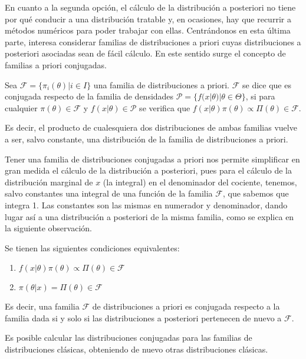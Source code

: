 \documentclass{article}
\begin{document}
En cuanto a la segunda opción, el cálculo de la distribución a posteriori no tiene por qué conducir a una distribución tratable y, en ocasiones, hay que recurrir a métodos numéricos para poder trabajar con ellas. Centrándonos en esta última parte, interesa considerar familias de distribuciones a priori cuyas distribuciones a posteriori asociadas sean de fácil cálculo. En este sentido surge el concepto de familias a priori conjugadas.

\begin{definition}
	Sea $\mathcal{F} = \{\pi_i(\theta)|i\in I\}$ una familia de distribuciones a priori. $\mathcal{F}$ se dice que es conjugada respecto de la familia de densidades $\mathcal{P} = \{f(x|\theta)|\theta\in\Theta\}$, si para cualquier $\pi(\theta)\in\mathcal{F}$ y $f(x|\theta)\in \mathcal{P}$ se verifica que $f(x|\theta)\pi(\theta)\propto\Pi(\theta)\in\mathcal{F}$.

	Es decir, el producto de cualesquiera dos distribuciones de ambas familias vuelve a ser, salvo constante, una distribución de la familia de distribuciones a priori.
\end{definition}

Tener una familia de distribuciones conjugadas a priori nos permite simplificar en gran medida el cálculo de la distribución a posteriori, pues para el cálculo de la distribución marginal de $x$ (la integral) en el denominador del cociente, tenemos, salvo constantes una integral de una función de la familia $\mathcal{F}$, que sabemos que integra 1. Las constantes son las mismas en numerador y denominador, dando lugar así a una distribución a posteriori de la misma familia, como se explica en la siguiente observación.

\begin{remark}
	Se tienen las siguientes condiciones equivalentes:
	\begin{enumerate}[label=\roman*]
		\item $f(x|\theta)\pi(\theta) \propto \Pi(\theta) \in \mathcal{F}$
		\item $\pi(\theta|x)=\Pi(\theta)\in\mathcal{F}$
	\end{enumerate}
	Es decir, una familia $\mathcal{F}$ de distribuciones a priori es conjugada respecto a la familia dada si y solo si las distribuciones a posteriori pertenecen de nuevo a $\mathcal{F}$.
\end{remark}

Es posible calcular las distribuciones conjugadas para las familias de distribuciones clásicas, obteniendo de nuevo otras distribuciones clásicas.
\end{document}
